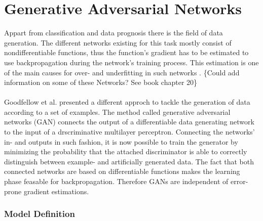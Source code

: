 \chapter{Generative Adversarial Networks}

Appart from classification and data prognosis there is the field of data generation.
The different networks existing for this task mostly consist of nondifferentiable functions, thus the function's gradient has to be estimated to use backpropagation during the network's training process.
This estimation is one of the main causes for over- and underfitting in such networks \cite{1}.
\{Could add information on some of these Networks? See book chapter 20\}
\\
\\
Goodfellow et al. \cite{1} presented a different approch to tackle the generation of data according to a set of examples.
The method called generative adversarial networks (GAN) connects the output of a differentiable data generating network to the input of a drscriminative multilayer perceptron.
Connecting the networks' in- and outputs in such fashion, it is now possible to train the generator by minimizing the probability that the attached discriminator is able to correctly distinguish between example- and artificially generated data.
The fact that both connected networks are based on differentiable functions makes the learning phase feasable for backpropagation. Therefore GANs are independent of error-prone gradient estimations.


  \subsection{Model Definition}

